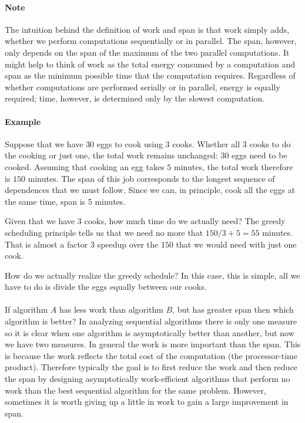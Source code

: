 \paragraph{Note}
The intuition behind the definition of work and span is that work
simply adds, whether we perform computations sequentially or in
parallel.  The span, however, only depends on the span of the maximum
of the two parallel computations.  It might help to think of work as
the total energy consumed by a computation and span as the minimum
possible time that the computation requires.  Regardless of whether
computations are performed serially or in parallel, energy is equally
required; time, however, is determined only by the slowest
computation.

\paragraph{Example}
Suppose that we have $30$ eggs to cook using $3$ cooks.  Whether all
$3$ cooks to do the cooking or just one, the total work remains
unchanged: $30$ eggs need to be cooked.
%
Assuming that cooking an egg takes $5$ minutes, the total work
therefore is $150$ minutes.
%
The span of this job corresponds to the longest sequence of
dependences that we must follow.
%
Since we can, in principle, cook all the eggs at the same time, 
span is 5 minutes.
%

Given that we have $3$ cooks, how much time do we actually need?
%
The greedy scheduling principle tells us that we need no more that
$150/3 + 5 = 55$ minutes. That is almost a factor $3$ speedup over the
$150$ that we would need with just one cook. 
%

How do we actually realize the greedy schedule?  In this case, this is
simple, all we have to do is divide the eggs equally between our
cooks.

\paragraph{}
If algorithm $A$ has less work than algorithm $B$, but has greater
span then which algorithm is better?  In analyzing sequential
algorithms there is only one measure so it is clear when one algorithm
is asymptotically better than another, but now we have two measures.
In general the work is more important than the span.  
%
This is because the work reflects the total cost of the computation
(the processor-time product).  Therefore typically the goal is to
first reduce the work and then reduce the span by designing
asymptotically work-efficient algorithms that perform no work
than the best sequential algorithm for the same problem. 
%
However, sometimes it is worth giving up a little in work to gain a
large improvement in span.
%


